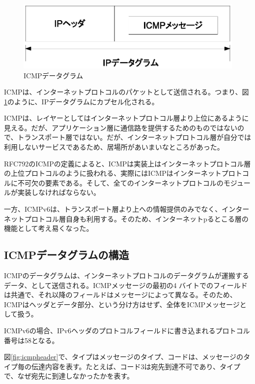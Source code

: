 \begin{figure}[htbp]
	\includegraphics[width=12cm,clip]{draw/icmpencup.eps}
	\caption{ICMPデータグラム}
	\label{fig:icmpencup}
\end{figure}

ICMPは、インターネットプロトコルのパケットとして送信される。つまり、図\ref{fig:icmpencup}のように、IPデータグラムにカプセル化される。

ICMPは、レイヤーとしてはインターネットプロトコル層より上位にあるように見える。だが、アプリケーション層に通信路を提供するためのものではないので、トランスポート層ではない。だが、インターネットプロトコル層が自分では利用しないサービスであるため、居場所があいまいなところがあった。



RFC792のICMPの定義によると、ICMPは実装上はインターネットプロトコル層の上位プロトコルのように扱われる、実際にはICMPはインターネットプロトコルに不可欠の要素である。そして、全てのインターネットプロトコルのモジュールが実装しなければならない。

一方、ICMPv6は、トランスポート層より上への情報提供のみでなく、インターネットプロトコル層自身も利用する。そのため、インターネットpるとこる層の機能として考え易くなった。

\subsection{ICMPデータグラムの構造}

ICMPのデータグラムは、インターネットプロトコルのデータグラムが運搬するデータ、として送信される。ICMPメッセージの最初の4 バイトでのフィールドは共通で、それ以降のフィールドはメッセージによって異なる。そのため、ICMPはヘッダとデータ部分、という分け方はせず、全体をICMPメッセージとして扱う。

ICMPv6の場合、IPv6ヘッダのプロトコルフィールドに書き込まれるプロトコル番号は58となる。

図\ref{fig:icmpheader}で、タイプはメッセージのタイプ、コードは、メッセージのタイプ毎の伝達内容を表す。たとえば、コード3は宛先到達不可であり、タイプで、なぜ宛先に到達しなかったかを表す。

